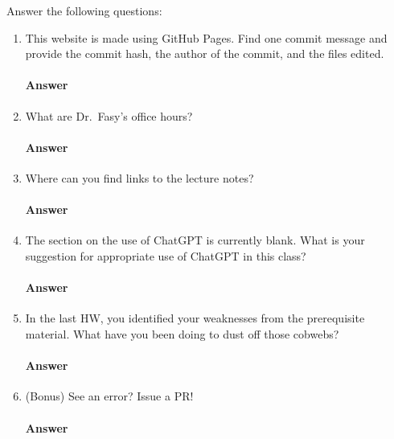 \documentclass{article}
\begin{document}
Answer the following questions:
\begin{enumerate}

    \item This website is made using GitHub Pages.  Find one commit message and
        provide the commit hash, the author of the commit, and the files edited.

         \paragraph{Answer} \todo{}

    \item What are Dr.~Fasy's office hours?

         \paragraph{Answer} \todo{}

    \item Where can you find links to the lecture notes?

         \paragraph{Answer} \todo{}

    \item The section on the use of ChatGPT is currently blank.  What is your
        suggestion for appropriate use of ChatGPT in this class?

         \paragraph{Answer} \todo{}

    \item In the last HW, you identified your weaknesses from the prerequisite
        material.  What have you been doing to dust off those cobwebs?

         \paragraph{Answer} \todo{}

     \item (Bonus) See an error?  Issue a PR!

         \paragraph{Answer} 
\end{enumerate}
\end{document}
